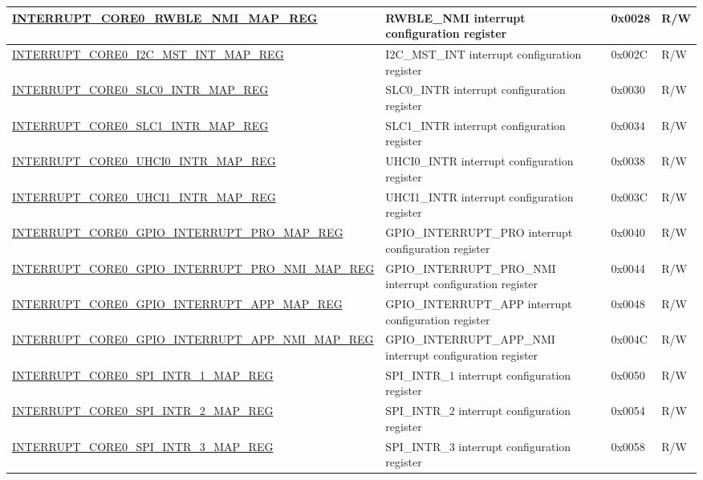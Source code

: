 \begin{landscape}
\begin{longtable}{ | p{10cm} | p{10.2cm} | p{1.3cm} | p{1cm} | }
\hyperref[regdesc:INTERRUPTCORE0RWBLENMIMAPREG]{INTERRUPT\_CORE0\_RWBLE\_NMI\_MAP\_REG} & RWBLE\_NMI interrupt configuration register & 0x0028 & R/W \\ \hline
\hyperref[regdesc:INTERRUPTCORE0I2CMSTINTMAPREG]{INTERRUPT\_CORE0\_I2C\_MST\_INT\_MAP\_REG} & I2C\_MST\_INT interrupt configuration register & 0x002C & R/W \\ \hline
\hyperref[regdesc:INTERRUPTCORE0SLC0INTRMAPREG]{INTERRUPT\_CORE0\_SLC0\_INTR\_MAP\_REG} & SLC0\_INTR interrupt configuration register & 0x0030 & R/W \\ \hline
\hyperref[regdesc:INTERRUPTCORE0SLC1INTRMAPREG]{INTERRUPT\_CORE0\_SLC1\_INTR\_MAP\_REG} & SLC1\_INTR interrupt configuration register & 0x0034 & R/W \\ \hline
\hyperref[regdesc:INTERRUPTCORE0UHCI0INTRMAPREG]{INTERRUPT\_CORE0\_UHCI0\_INTR\_MAP\_REG} & UHCI0\_INTR interrupt configuration register & 0x0038 & R/W \\ \hline
\hyperref[regdesc:INTERRUPTCORE0UHCI1INTRMAPREG]{INTERRUPT\_CORE0\_UHCI1\_INTR\_MAP\_REG} & UHCI1\_INTR interrupt configuration register & 0x003C & R/W \\ \hline
\hyperref[regdesc:INTERRUPTCORE0GPIOINTERRUPTPROMAPREG]{INTERRUPT\_CORE0\_GPIO\_INTERRUPT\_PRO\_MAP\_REG} & GPIO\_INTERRUPT\_PRO interrupt configuration register & 0x0040 & R/W \\ \hline
\hyperref[regdesc:INTERRUPTCORE0GPIOINTERRUPTPRONMIMAPREG]{INTERRUPT\_CORE0\_GPIO\_INTERRUPT\_PRO\_NMI\_MAP\_REG} & GPIO\_INTERRUPT\_PRO\_NMI interrupt configuration register & 0x0044 & R/W \\ \hline
\hyperref[regdesc:INTERRUPTCORE0GPIOINTERRUPTAPPMAPREG]{INTERRUPT\_CORE0\_GPIO\_INTERRUPT\_APP\_MAP\_REG} & GPIO\_INTERRUPT\_APP interrupt configuration register & 0x0048 & R/W \\ \hline
\hyperref[regdesc:INTERRUPTCORE0GPIOINTERRUPTAPPNMIMAPREG]{INTERRUPT\_CORE0\_GPIO\_INTERRUPT\_APP\_NMI\_MAP\_REG} & GPIO\_INTERRUPT\_APP\_NMI interrupt configuration register & 0x004C & R/W \\ \hline
\hyperref[regdesc:INTERRUPTCORE0SPIINTR1MAPREG]{INTERRUPT\_CORE0\_SPI\_INTR\_1\_MAP\_REG} & SPI\_INTR\_1 interrupt configuration register & 0x0050 & R/W \\ \hline
\hyperref[regdesc:INTERRUPTCORE0SPIINTR2MAPREG]{INTERRUPT\_CORE0\_SPI\_INTR\_2\_MAP\_REG} & SPI\_INTR\_2 interrupt configuration register & 0x0054 & R/W \\ \hline
\hyperref[regdesc:INTERRUPTCORE0SPIINTR3MAPREG]{INTERRUPT\_CORE0\_SPI\_INTR\_3\_MAP\_REG} & SPI\_INTR\_3 interrupt configuration register & 0x0058 & R/W \\ \hline

\end{longtable}
\end{landscape}
